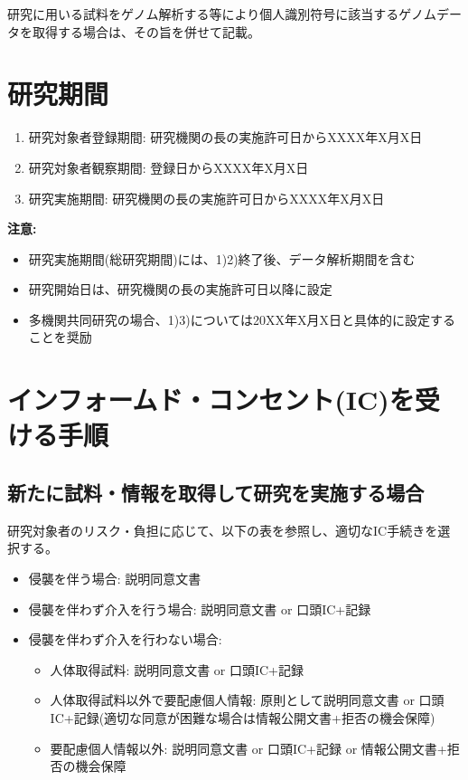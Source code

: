 \documentclass{kyodai-protocol}
\begin{document}
研究に用いる試料をゲノム解析する等により個人識別符号に該当するゲノムデータを取得する場合は、その旨を併せて記載。

\section{研究期間}
\label{sec:period}

\begin{enumerate}
\item 研究対象者登録期間: 研究機関の長の実施許可日からXXXX年X月X日
\item 研究対象者観察期間: 登録日からXXXX年X月X日
\item 研究実施期間: 研究機関の長の実施許可日からXXXX年X月X日
\end{enumerate}

\textbf{注意:}
\begin{itemize}
\item 研究実施期間(総研究期間)には、1)2)終了後、データ解析期間を含む
\item 研究開始日は、研究機関の長の実施許可日以降に設定
\item 多機関共同研究の場合、1)3)については20XX年X月X日と具体的に設定することを奨励
\end{itemize}

\section{インフォームド・コンセント(IC)を受ける手順}
\label{sec:ic}

\subsection{新たに試料・情報を取得して研究を実施する場合}

研究対象者のリスク・負担に応じて、以下の表を参照し、適切なIC手続きを選択する。

\begin{itemize}
\item 侵襲を伴う場合: 説明同意文書
\item 侵襲を伴わず介入を行う場合: 説明同意文書 or 口頭IC+記録
\item 侵襲を伴わず介入を行わない場合:
  \begin{itemize}
  \item 人体取得試料: 説明同意文書 or 口頭IC+記録
  \item 人体取得試料以外で要配慮個人情報: 原則として説明同意文書 or 口頭IC+記録(適切な同意が困難な場合は情報公開文書+拒否の機会保障)
  \item 要配慮個人情報以外: 説明同意文書 or 口頭IC+記録 or 情報公開文書+拒否の機会保障
  \end{itemize}
\end{itemize}
\end{document}
